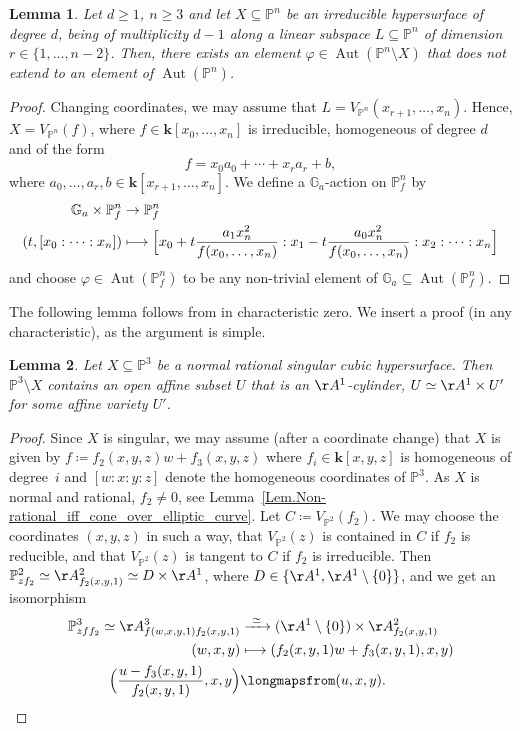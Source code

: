 \documentclass[JEP,XML,SOM,Unicode,NoFloatCountersInSection,published]{cedram}
\newcommand\mto{\mathchoice{\longmapsto}{\mapsto}{\mapsto}{\mapsto}}
\newtheorem{lemma}{Lemma}[section]
\theoremstyle{definition}
\renewcommand\k{{\mathbf k}}
\newcommand\p{{\mathbb P}}\let\PP\p
\newcommand{\kk}{\mathbf{k}}
\DeclareMathOperator{\Aut}{Aut}
\begin{document}
\begin{lemma}\label{Lem:LinSubdm1}
Let $d\ge 1$, $n\ge 3$ and let $X\subseteq \p^n$ be an irreducible hypersurface of degree $d$, being of multiplicity $d-1$ along a linear subspace $L\subseteq \p^n$ of dimension $r\in \{1,\ldots,n-2\}$. Then, there exists an element $\varphi\in \Aut(\p^n\setminus X)$ that does not extend to an element of $\Aut(\p^n)$.
\end{lemma}
\begin{proof}
Changing coordinates, we may assume that $L=V_{\p^n}(x_{r+1},\ldots,x_n)$. Hence, $X=V_{\p^n}(f)$, where $f\in \k[x_0,\ldots,x_{n}]$ is irreducible, homogeneous of degree $d$ and of the form
\[
f=x_0a_0+\cdots+x_ra_r+b,
\]
where $a_0,\ldots,a_r,b\in \k[x_{r+1},\ldots,x_n]$. We define a $\mathbb{G}_a$-action on $\p^n_f$ by
\begin{align*}
\mathbb{G}_a\times \p^n_f& \to\p^n_f\\
(t, [x_0:\cdots:x_n]) &\mto \Bigl[x_0+t \frac{a_1 x_n^2}{f(x_0,\ldots,x_n)}:x_1-t \frac{a_0 x_n^2}{f(x_0,\ldots,x_n)}:x_2:\cdots:x_n\Bigr]
\end{align*}
and choose $\varphi\in \Aut(\p^n_f)$ to be any non-trivial element of $\mathbb{G}_a\subseteq \Aut(\p^n_f)$.
\end{proof}

The following lemma follows from \cite[Th.\,C \& Th.\,4.3]{CheDub} in characteristic zero.
We insert a proof (in any characteristic), as the argument is simple.

\begin{lemma}
\label{Lem.Contains_Cylinder}
Let $X \subseteq \PP^3$ be a normal rational singular cubic hypersurface. Then
$\PP^3 \setminus X$ contains an open affine subset $U$ that is an $\AA^1$-cylinder, \ie $U \simeq \AA^1 \times U'$
for some affine variety $U'$.
\end{lemma}

\begin{proof}
Since $X$ is singular, we may assume (after a coordinate change) that $X$ is given by
$f \coloneqq f_2(x, y, z) w + f_3(x, y, z)$
where $f_i \in \kk[x, y, z]$ is homogeneous of degree~$i$ and $[w:x:y:z]$ denote the homogeneous coordinates of $\PP^3$. As $X$ is normal and rational, $f_2 \neq 0$, see Lemma~\ref{Lem.Non-rational_iff_cone_over_elliptic_curve}.
Let $C \coloneqq V_{\PP^2}(f_2)$. We may choose the coordinates $(x,y, z)$
in such a way, that $V_{\PP^2}(z)$ is contained in $C$ if $f_2$ is reducible, and
that $V_{\PP^2}(z)$ is tangent to $C$ if $f_2$ is irreducible. Then
$\p^2_{zf_2}\simeq \AA^2_{f_2(x, y, 1)} \simeq D \times \AA^1$, where $D \in \{\AA^1, \AA^1 \setminus \{0\} \}$,
and we get an isomorphism
\begin{align*}
\PP^3_{zff_2} \simeq \AA^3_{f(w, x, y, 1) f_2(x, y, 1)} & \xrightarrow{~\simeq~}
(\AA^1 \setminus \{0\}) \times \AA^2_{f_2(x, y, 1)} \\
(w, x, y) & \mto  (f_2(x, y, 1)w + f_3(x, y, 1), x, y) \\
\Bigl(\frac{u - f_3(x, y, 1)}{f_2(x, y, 1)}, x, y \Bigr)
& \longmapsfrom (u, x, y).\qedhere
\end{align*}
\end{proof}
\end{document}
